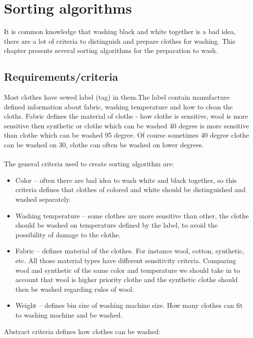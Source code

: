 %
\section{Sorting algorithms}

It is common knowledge that washing black and white together is a bad idea, there are a lot of criteria to distinguish and prepare clothes for washing. This chapter presents several sorting algorithms for the preparation to wash. 

\subsection{Requirements/criteria}

Most clothes have sewed label (tag) in them.The label contain manufacture defined information about fabric, washing temperature and how to clean the cloths. Fabric defines the material of clothe - how clothe is sensitive, wool is more sensitive then synthetic or clothe which can be washed 40 degree is more sensitive than clothe which can be washed 95 degree. Of course sometimes 40 degree clothe can be washed on 30, clothe can often be washed on lower degrees. \\ \\ The general criteria used to create sorting algorithm are:

\begin{itemize}
	\item Color – often there are bad idea to wash white and black together, so this criteria defines that clothes of colored and white should be distinguished and washed separately. 
	\item Washing temperature – some clothes are more sensitive than other, the clothe should be washed on temperature defined by the label, to avoid the possibility of damage to the clothe.
	\item Fabric – defines material of the clothes. For instance wool, cotton, synthetic, etc. All those material types have different sensitivity criteria. Comparing wool and synthetic of the same color and temperature we should take in to account that wool is higher priority clothe and the synthetic clothe should then be washed regarding rules of wool.
	\item Weight – defines bin size of washing machine size. How many clothes can fit to washing machine and be washed.
\end{itemize}

Abstract criteria defines how clothes can be washed:

